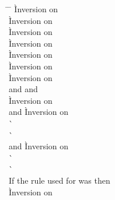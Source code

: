 \begin{description}
  \begin{tabbing}
  \hspace{3em} \= \hspace{3em} \= \kill
    \` Inversion on \presbinopunwind \\
    \` Inversion on \presbinopunwind \\
    \` Inversion on \presbinopunwind \\
    \` Inversion on \presbinopunwind \\
    \` Inversion on \presbinopunwind \\
    \` Inversion on \presbinopunwind \\
    \` Inversion on \presbinopunwind \\
   and  and  \\
    \` Inversion on  \\
   and 
    \` Inversion on  \\
    \`  \\
    \`  \\
   and 
    \` Inversion on  \\
    \`  \\
    \`  \\
  If the rule used for \presbinopunwind{} was {\tt {}} then \+ \\
      \` Inversion on \presbinopunwind \\
     \\

\end{tabbing}
\end{description}
